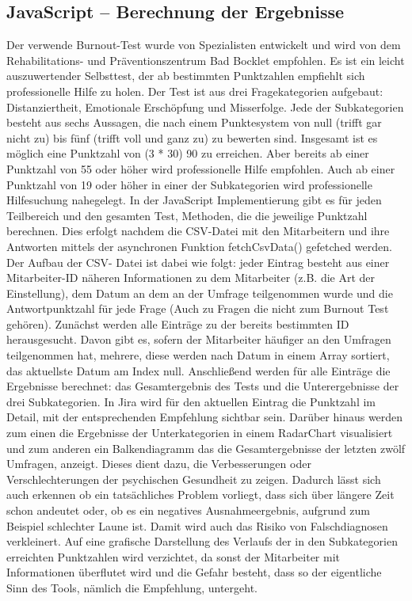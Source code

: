 \documentclass[a4paper,12pt,]{article}
\begin{document}
\subsection{JavaScript – Berechnung der Ergebnisse}
Der verwende Burnout-Test wurde von Spezialisten entwickelt und wird von dem Re\-habi\-litations- und Präventionszentrum Bad Bocklet empfohlen. Es ist ein leicht auszuwertender Selbsttest, der ab bestimmten Punktzahlen empfiehlt sich professionelle Hilfe zu holen. Der Test ist aus drei Fragekategorien aufgebaut: Distanziertheit, Emotionale Erschöpfung und Misserfolge. Jede der Subkategorien besteht aus sechs Aussagen, die nach einem Punktesystem von null  (trifft gar nicht zu) bis fünf (trifft voll und ganz zu) zu bewerten sind. Insgesamt ist es möglich eine Punktzahl von (3 * 30) 90 zu erreichen. Aber bereits ab einer Punktzahl von 55 oder höher wird professionelle Hilfe empfohlen. Auch ab einer Punktzahl von 19 oder höher in einer der Subkategorien wird professionelle Hilfesuchung nahegelegt. 
In der JavaScript Implementierung gibt es für jeden Teilbereich und den gesamten Test, Methoden, die die jeweilige Punktzahl berechnen. Dies erfolgt nachdem die CSV-Datei mit den Mitarbeitern und ihre Antworten mittels der asynchronen Funktion fetchCsvData() gefetched werden. Der Aufbau der CSV- Datei ist dabei wie folgt: jeder Eintrag besteht aus einer Mitarbeiter-ID näheren Informationen zu dem Mitarbeiter (z.B. die Art der Einstellung), dem Datum an dem an der Umfrage teilgenommen wurde und die Antwortpunktzahl für jede Frage (Auch zu Fragen die nicht zum Burnout Test gehören). Zunächst werden alle Einträge zu der bereits bestimmten ID herausgesucht. Davon gibt es, sofern der Mitarbeiter häufiger an den Umfragen teilgenommen hat, mehrere, diese werden nach Datum in einem Array sortiert, das aktuellste Datum am Index null.  Anschließend werden für alle Einträge die Ergebnisse berechnet: das Gesamtergebnis des Tests und die Unterergebnisse der drei Subkategorien. In Jira wird für den aktuellen Eintrag die Punktzahl im Detail, mit der entsprechenden Empfehlung sichtbar sein. Darüber hinaus werden zum einen die Ergebnisse der Unterkategorien in einem RadarChart visualisiert und zum anderen ein Balkendiagramm das die Gesamtergebnisse der letzten zwölf Umfragen, anzeigt. Dieses dient dazu, die Verbesserungen oder Verschlechterungen der psychischen Gesundheit zu zeigen. Dadurch lässt sich auch erkennen ob ein tatsächliches Problem vorliegt, dass sich über längere Zeit schon andeutet oder, ob es ein negatives Ausnahmeergebnis, aufgrund zum Beispiel schlechter Laune ist. Damit wird auch das Risiko von Falschdiagnosen verkleinert. Auf eine grafische Darstellung des Verlaufs der in den Subkategorien erreichten Punktzahlen wird verzichtet, da sonst der Mitarbeiter mit Informationen überflutet wird und die Gefahr besteht, dass so der eigentliche Sinn des Tools, nämlich die Empfehlung, untergeht.
\end{document}
